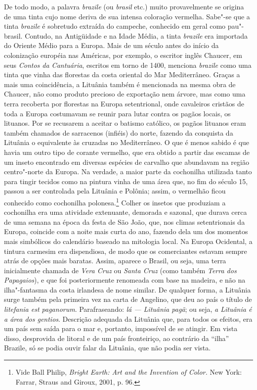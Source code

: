 De todo modo, a palavra \emph{brazile} (ou \emph{brasil} etc.) muito
provavelmente se origina de uma tinta cujo nome deriva de sua intensa
coloração vermelha. Sabe"-se que a tinta \emph{brazile} é sobretudo
extraída do campeche, conhecido em geral como pau"-brasil. Contudo, na
Antigüidade e na Idade Média, a tinta \emph{brazile} era importada do
Oriente Médio para a Europa. Mais de um século antes do início da
colonização européia nas Américas, por exemplo, o escritor inglês
Chaucer, em seus \emph{Contos da Cantuária}, escritos em torno de 1400,
menciona \emph{brazile} como uma tinta que vinha das florestas da costa
oriental do Mar Mediterrâneo. Graças a mais uma coincidência, a Lituânia
também é mencionada na mesma obra de Chaucer, não como produto precioso
de exportação nem árvore, mas como uma terra recoberta por florestas na
Europa setentrional, onde cavaleiros cristãos de toda a Europa
costumavam se reunir para lutar contra os pagãos locais, os lituanos.
Por se recusarem a aceitar o batismo católico, os pagãos lituanos eram
também chamados de sarracenos (infiéis) do norte, fazendo da conquista
da Lituânia o equivalente às cruzadas no Mediterrâneo. O que é menos
sabido é que havia um outro tipo de corante vermelho, que era obtido a
partir das escamas de um inseto encontrado em diversas espécies de
carvalho que abundavam na região centro"-norte da Europa. Na verdade, a
maior parte da cochonilha utilizada tanto para tingir tecidos como na
pintura vinha de uma área que, no fim do século 15, passou a ser
controlada pela Lituânia e Polônia; assim, o vermelhão ficou conhecido
como cochonilha polonesa.\footnote{Vide Ball Philip, \emph{Bright Earth:
  Art and the Invention of Color.} New York: Farrar, Straus and Giroux,
  2001, p. 96.} Colher os insetos que produziam a cochonilha era uma
atividade extenuante, demorada e sazonal, que durava cerca de uma semana
na época da festa de São João, que, nos climas setentrionais da Europa,
coincide com a noite mais curta do ano, fazendo dela um dos momentos
mais simbólicos do calendário baseado na mitologia local. Na Europa
Ocidental, a tintura carmesim era dispendiosa, de modo que os
comerciantes estavam sempre atrás de opções mais baratas. Assim, aparece
o Brasil, ou seja, uma terra inicialmente chamada de \emph{Vera Cruz} ou
\emph{Santa Cruz} (como também \emph{Terra dos Papagaios}), e que foi
posteriormente renomeada com base na madeira, e não na ilha"-fantasma da
costa irlandesa de nome similar. De qualquer forma, a Lituânia surge
também pela primeira vez na carta de Angelino, que deu ao país o título
de \emph{litefania est paganorum}. Parafraseando: \emph{lá --- Lituânia
pagã}; ou seja, \emph{a Lituânia é a área dos gentios}. Descrição
adequada da Lituânia que, para todos os efeitos, era um país sem saída
para o mar e, portanto, impossível de se atingir. Em vista disso,
desprovida de litoral e de um país fronteiriço, ao contrário da ``ilha''
Brazile, só se podia ouvir falar da Lituânia, que não podia ser vista.

